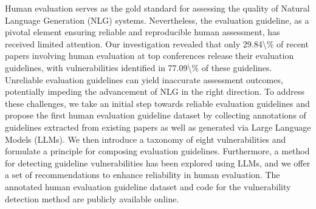 Human evaluation serves as the gold standard for assessing the quality of Natural Language Generation (NLG) systems. Nevertheless, the evaluation guideline, as a pivotal element ensuring reliable and reproducible human assessment, has received limited attention. Our investigation revealed that only 29.84\textbackslash{}\% of recent papers involving human evaluation at top conferences release their evaluation guidelines, with vulnerabilities identified in 77.09\textbackslash{}\% of these guidelines. Unreliable evaluation guidelines can yield inaccurate assessment outcomes, potentially impeding the advancement of NLG in the right direction. To address these challenges, we take an initial step towards reliable evaluation guidelines and propose the first human evaluation guideline dataset by collecting annotations of guidelines extracted from existing papers as well as generated via Large Language Models (LLMs). We then introduce a taxonomy of eight vulnerabilities and formulate a principle for composing  evaluation guidelines. Furthermore, a method for detecting guideline vulnerabilities has been explored using LLMs, and we offer a set of recommendations to enhance reliability in human evaluation. The annotated human evaluation guideline dataset and code for the vulnerability detection method are publicly available online.